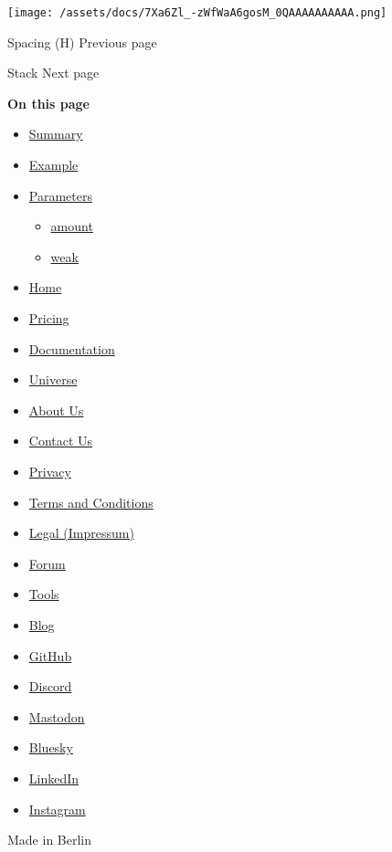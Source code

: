 \texttt{[image: /assets/docs/7Xa6Zl\_-zWfWaA6gosM\_0QAAAAAAAAAA.png]}

\href{/docs/reference/layout/h/}{\pandocbounded{}}

{ Spacing (H) } { Previous page }

\href{/docs/reference/layout/stack/}{\pandocbounded{}}

{ Stack } { Next page }

\textbf{On this page}

\begin{itemize}
\tightlist
\item
  \hyperref[summary]{Summary}
\item
  \hyperref[example]{Example}
\item
  \hyperref[parameters]{Parameters}

  \begin{itemize}
  \tightlist
  \item
    \hyperref[parameters-amount]{amount}
  \item
    \hyperref[parameters-weak]{weak}
  \end{itemize}
\end{itemize}

\begin{itemize}
\tightlist
\item
  \href{/}{Home}
\item
  \href{/pricing/}{Pricing}
\item
  \href{/docs/}{Documentation}
\item
  \href{/universe/}{Universe}
\item
  \href{/about/}{About Us}
\item
  \href{/contact/}{Contact Us}
\item
  \href{/privacy/}{Privacy}
\item
  \href{https://typst.app/terms}{Terms and Conditions}
\item
  \href{/legal/}{Legal (Impressum)}
\end{itemize}

\begin{itemize}
\tightlist
\item
  \href{https://forum.typst.app}{Forum}
\item
  \href{/tools/}{Tools}
\item
  \href{/blog/}{Blog}
\item
  \href{https://github.com/typst/}{GitHub}
\item
  \href{https://discord.gg/2uDybryKPe}{Discord}
\item
  \href{https://mastodon.social/@typst}{Mastodon}
\item
  \href{https://bsky.app/profile/typst.app}{Bluesky}
\item
  \href{https://www.linkedin.com/company/typst/}{LinkedIn}
\item
  \href{https://instagram.com/typstapp/}{Instagram}
\end{itemize}

Made in Berlin
